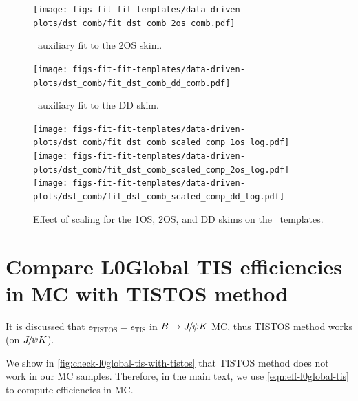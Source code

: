 \begin{figure}[htb]
    \centering
    \texttt{[image: figs-fit-fit-templates/data-driven-plots/dst\_comb/fit\_dst\_comb\_2os\_comb.pdf]}
    \caption{
        \DstComb\ auxiliary fit to the 2OS skim.
    }
    \label{fig:dst-comb-fit-2os}
\end{figure}

\begin{figure}[htb]
    \centering
    \texttt{[image: figs-fit-fit-templates/data-driven-plots/dst\_comb/fit\_dst\_comb\_dd\_comb.pdf]}
    \caption{
        \DstComb\ auxiliary fit to the DD skim.
    }
    \label{fig:dst-comb-fit-dd}
\end{figure}

\begin{figure}[htb]
    \centering
    \texttt{[image: figs-fit-fit-templates/data-driven-plots/dst\_comb/fit\_dst\_comb\_scaled\_comp\_1os\_log.pdf]}
    \texttt{[image: figs-fit-fit-templates/data-driven-plots/dst\_comb/fit\_dst\_comb\_scaled\_comp\_2os\_log.pdf]}
    \texttt{[image: figs-fit-fit-templates/data-driven-plots/dst\_comb/fit\_dst\_comb\_scaled\_comp\_dd\_log.pdf]}

    \caption{
        Effect of scaling for the 1OS, 2OS, and DD skims on the \DstComb\
        templates.
    }
    \label{fig:dst-comb-scale-other-skims}
\end{figure}


\section{Compare L0Global TIS efficiencies in MC with TISTOS method}
\label{appx:suppl:l0global-tis}

It is discussed that
$\epsilon_\text{TISTOS} = \epsilon_\text{TIS}$ in $B \rightarrow {\ensuremath{{J\mskip -3mu/\mskip -2mu\psi}}} K$ MC,
thus TISTOS method works (on ${{J\mskip -3mu/\mskip -2mu\psi}} K$).

We show in \cref{fig:check-l0global-tis-with-tistos} that TISTOS method does not
work in our MC samples.
Therefore, in the main text, we use \cref{eqn:eff-l0global-tis} to compute
efficiencies in MC.

